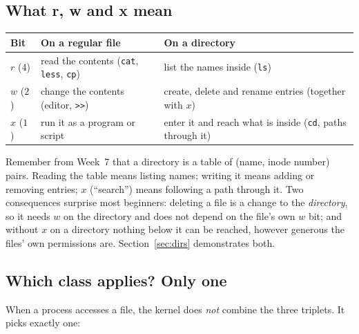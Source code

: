 \documentclass[11pt,a4paper]{article}
\newcommand{\cmd}[1]{\texttt{#1}}
\begin{document}


\subsection{What r, w and x mean}

\begin{center}
\small
\begin{tabularx}{\linewidth}{@{}l X X@{}}
\toprule
\textbf{Bit} & \textbf{On a regular file} & \textbf{On a directory} \\
\midrule
$r$ ($4$) & read the contents (\cmd{cat}, \cmd{less}, \cmd{cp}) & list the names inside (\cmd{ls}) \\
$w$ ($2$) & change the contents (editor, \texttt{>>}) & create, delete and rename entries (together with $x$) \\
$x$ ($1$) & run it as a program or script & enter it and reach what is inside (\cmd{cd}, paths through it) \\
\bottomrule
\end{tabularx}
\end{center}

Remember from Week~7 that a directory is a table of (name, inode number) pairs. Reading the table means listing names; writing it means adding or removing entries; $x$ (``search'') means following a path through it. Two consequences surprise most beginners: deleting a file is a change to the \emph{directory}, so it needs $w$ on the directory and does not depend on the file's own $w$ bit; and without $x$ on a directory nothing below it can be reached, however generous the files' own permissions are. Section~\ref{sec:dirs} demonstrates both.

\subsection{Which class applies? Only one}

When a process accesses a file, the kernel does \emph{not} combine the three triplets. It picks exactly one:
\end{document}
